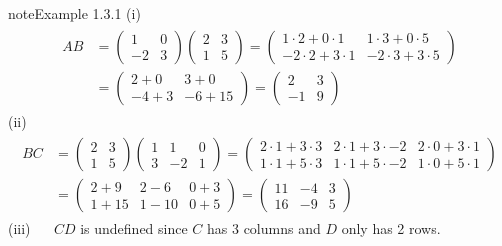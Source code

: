 \documentclass[letterpaper,10pt,english]{jupyterBook}
\begin{document}
\begin{sphinxadmonition}{note}{Example 1.3.1}
\sphinxAtStartPar
(i)  
\begin{equation*}
\begin{split} \begin{align*}
    AB &= \begin{pmatrix} 1 & 0 \\ -2 & 3 \end{pmatrix} \begin{pmatrix} 2 & 3 \\ 1 & 5 \end{pmatrix}
    = \begin{pmatrix} 1 \cdot 2 + 0 \cdot 1 & 1 \cdot 3 + 0 \cdot 5\\ -2 \cdot 2 + 3 \cdot 1 & -2 \cdot 3 + 3 \cdot 5 \end{pmatrix} \\
    &= \begin{pmatrix} 2 + 0 & 3 + 0 \\ -4 + 3 & -6 + 15\end{pmatrix}
    = \begin{pmatrix} 2 & 3 \\ -1 & 9 \end{pmatrix}
\end{align*} \end{split}
\end{equation*}
\sphinxAtStartPar
(ii)  
\begin{equation*}
\begin{split} \begin{align*}
    BC &= \begin{pmatrix} 2 & 3 \\ 1 & 5 \end{pmatrix} \begin{pmatrix} 1 & 1 & 0 \\ 3 & -2 & 1 \end{pmatrix}
    = \begin{pmatrix}
        2 \cdot 1 + 3 \cdot 3 & 2 \cdot 1 + 3 \cdot -2 & 2 \cdot 0 + 3 \cdot 1 \\
        1 \cdot 1 + 5 \cdot 3 & 1 \cdot 1 + 5 \cdot -2 & 1 \cdot 0 + 5 \cdot 1
    \end{pmatrix} \\
    &= \begin{pmatrix} 2+9 & 2-6 & 0+3 \\ 1+15 & 1-10 & 0+5 \end{pmatrix}
    = \begin{pmatrix}11 & -4 & 3 \\ 16 & -9 & 5 \end{pmatrix}
\end{align*} \end{split}
\end{equation*}
\sphinxAtStartPar
(iii)   \(CD\) is undefined since \(C\) has 3 columns and \(D\) only has 2 rows.


\end{sphinxadmonition}
\end{document}
